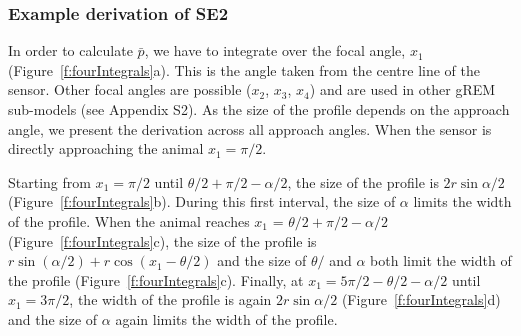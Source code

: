 \documentclass[a4paper,10pt,reqno,oneside]{amsart}
\begin{document}
\subsubsection{Example derivation of SE2}

In order to calculate $\bar{p}$, we have to integrate over the focal angle, $x_1$ (Figure~\ref{f:fourIntegrals}a). This is the angle taken from the centre line of the sensor. Other focal angles are possible ($x_2$, $x_3$, $x_4$) and are used in other gREM sub-models (see Appendix S2). As the size of the profile depends on the approach angle, we present the derivation across all approach angles. When the sensor is directly approaching the animal $x_1  = \pi/2$.

Starting from $x_1 = \pi/2$ until $\theta/2 + \pi/2 - \alpha/2$, the size of the profile is $2r\sin \alpha/2$ (Figure~\ref{f:fourIntegrals}b). During this first interval, the size of $\alpha$ limits the width of the profile. When the animal reaches $x_1$  = $\theta/2 + \pi/2 - \alpha/2$ (Figure~\ref{f:fourIntegrals}c), the size of the profile is $r\sin( \alpha/2) + r\cos( x_1  - \theta/2)$ and the size of $\theta/$ and $\alpha$ both limit the width of the profile (Figure~\ref{f:fourIntegrals}c). Finally, at $x_1  = 5\pi/2 - \theta/2  - \alpha/2$ until $x_1  = 3\pi/2$, the width of the profile is again $2r\sin\alpha/2$ (Figure~\ref{f:fourIntegrals}d) and the size of $\alpha$ again limits the width of the profile. 
\end{document}
